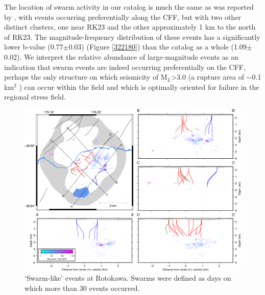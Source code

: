 The location of swarm activity in our catalog is much the same as was reported by \citet[][Figure 5]{Sewell_2015WGC}, with events occurring preferentially along the CFF, but with two other distinct clusters, one near RK23 and the other approximately 1 km to the north of RK23. The magnitude-frequency distribution of these events has a significantly lower b-value (0.77$\pm$0.03) (Figure \ref{322180}) than the catalog as a whole (1.09$\pm$0.02). We interpret the relative abundance of large-magnitude events as an indication that swarm events are indeed occurring preferentially on the CFF, perhaps the only structure on which seismicity of M$_L$\textgreater3.0 (a rupture area of $\sim$0.1 km$^2$ \citep{stein_2000}) can occur within the field and which is optimally oriented for failure in the regional stress field.
\begin{figure}[h!]
\begin{center}
\includegraphics[width=0.98\columnwidth]{Chapter_4_Rot/figures/merc_Rot_dets_GC_swarms_30/merc_Rot_dets_GC_swarms_30_original}
\caption{{`Swarm-like' events at Rotokawa. Swarms were defined as days on which
more than 30 events occurred.
{\label{117000}}%
}}
\end{center}
\end{figure}
